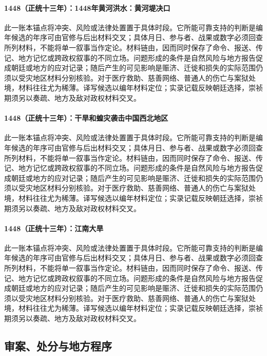 \paragraph{1448（正统十三年）：1448年黄河洪水：黄河堤决口} 此一账本锚点将冲突、风险或法律处置置于具体时段。它所能可靠支持的判断是编年候选的年序可由官修与后出材料交叉；具体月日、参与者、战果或数字必须回查所列材料，不能将单一叙事当作定论。材料链由，因而同时保存了命令、报送、传记、地方记忆或跨政权叙事的不同立场。问题形成的条件是自然风险与地方报告促成朝廷或地方的应对记录；随后产生的可见影响是赈济、迁徙和损失的实际范围仍须以受灾地区材料分别核验。对于医疗救助、慈善网络、普通人的伤亡与案狱处境，材料往往尤为稀薄。译写候选以编年材料定位；实录记载反映朝廷选择，崇祯期须另以奏疏、地方及敌对政权材料交叉。

\paragraph{1448（正统十三年）：干旱和蝗灾袭击中国西北地区} 此一账本锚点将冲突、风险或法律处置置于具体时段。它所能可靠支持的判断是编年候选的年序可由官修与后出材料交叉；具体月日、参与者、战果或数字必须回查所列材料，不能将单一叙事当作定论。材料链由，因而同时保存了命令、报送、传记、地方记忆或跨政权叙事的不同立场。问题形成的条件是自然风险与地方报告促成朝廷或地方的应对记录；随后产生的可见影响是赈济、迁徙和损失的实际范围仍须以受灾地区材料分别核验。对于医疗救助、慈善网络、普通人的伤亡与案狱处境，材料往往尤为稀薄。译写候选以编年材料定位；实录记载反映朝廷选择，崇祯期须另以奏疏、地方及敌对政权材料交叉。

\paragraph{1448（正统十三年）：江南大旱} 此一账本锚点将冲突、风险或法律处置置于具体时段。它所能可靠支持的判断是编年候选的年序可由官修与后出材料交叉；具体月日、参与者、战果或数字必须回查所列材料，不能将单一叙事当作定论。材料链由，因而同时保存了命令、报送、传记、地方记忆或跨政权叙事的不同立场。问题形成的条件是自然风险与地方报告促成朝廷或地方的应对记录；随后产生的可见影响是赈济、迁徙和损失的实际范围仍须以受灾地区材料分别核验。对于医疗救助、慈善网络、普通人的伤亡与案狱处境，材料往往尤为稀薄。译写候选以编年材料定位；实录记载反映朝廷选择，崇祯期须另以奏疏、地方及敌对政权材料交叉。

\subsection{审案、处分与地方程序}

